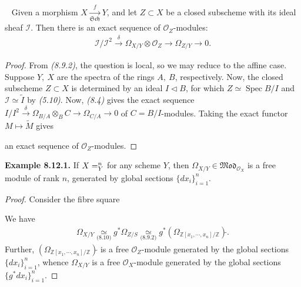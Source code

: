 \documentclass[11pt,a4paper,footinclude=true,headinclude=true]{scrbook} %
\DeclareMathOperator{\Spec}{Spec}
\let\AA\relax
\DeclareMathOperator{\AA}{\mathbb{A}}
\newcommand{\II}{\mathscr{I}}
\newcommand{\OO}{\mathcal{O}}
\newcommand{\Sch}{\mathfrak{Sch}}
\newcommand{\<}{\langle}
\newcommand{\>}{\rangle}
\newcommand{\MOD}{\mathfrak{Mod}}
\newcommand\FibSq[2][\square]{%
  \arrow[mysymbol]{#2}[description]{#1}}
\newenvironment{proposition}[2][]
{\renewcommand\theinnercustomprop{#2}\innercustomprop[#1] 
\begin{mdframed}[backgroundcolor=gray!20]\ }
{\end{mdframed}\endinnercustomprop}
\newenvironment{example}[2][Example]
    { \begin{mdframed}[backgroundcolor=gray!20] \textbf{#1 #2.} }
    {  \end{mdframed}}
\begin{document}
\begin{proposition}{8.12}
    Given a morphism $X\xrightarrow[\Sch]{f}Y$, and let $Z\subset X$ be a closed subscheme with its ideal sheaf $\II$. Then there is an exact sequence of $\OO_Z$-modules:
    \begin{align*}
        \II/\II^2\xrightarrow{~~\delta~~}\Omega_{X/Y}\otimes\OO_Z\longrightarrow\Omega_{Z/Y}\longrightarrow0.
    \end{align*}
\end{proposition}
\begin{proof}
    From \textit{(8.9.2)}, the question is local, so we may reduce to the affine case. Suppose $Y,\ X$ are the spectra of the rings $A,\ B$, respectively. Now, the closed subscheme $Z\subset X$ is determined by an ideal $I\triangleleft B$, for which $Z\simeq\Spec B/I$ and $\II\simeq\widetilde{I}$ by \textit{(5.10)}. Now, \textit{(8.4)} gives the exact sequence $I/I^2\xrightarrow{\delta}\Omega_{B/A}\otimes_BC\to\Omega_{C/A}\to0$ of $C=B/I$-modules. Taking the exact functor $M\mapsto\widetilde{M}$ gives
    \begin{center}
    \end{center}
    an exact sequence of $\OO_Z$-modules.
\end{proof}

\begin{example}{8.12.1}
    If $X=\AA_Y^n$ for any scheme $Y$, then $\Omega_{X/Y}\in\MOD_{\OO_X}$ is a free module of rank $n$, generated by global sections $\{dx_i\}_{i=1}^n$. 
\end{example}
\begin{proof}
    Consider the fibre square
    \begin{center}
    \end{center}
    We have 
    \begin{align*}
        \Omega_{X/Y}\underset{\textit{(8.10)}}{\simeq}g^\ast\Omega_{Z/S}\underset{\textit{(8.9.2)}}{\simeq}g^\ast(\Omega_{\mathbb{Z}[x_1,\cdots,x_n]/\mathbb{Z}})\widetilde{}.
    \end{align*}
    Further, $(\Omega_{\mathbb{Z}[x_1,\cdots,x_n]/\mathbb{Z}})\widetilde{}$ is a free $\OO_Z$-module generated by the global sections $\{dx_i\}_{i=1}^n$, whence $\Omega_{X/Y}$ is a free $\OO_X$-module generated by the global sections $\{g^\ast dx_i\}_{i=1}^n$.
\end{proof}
\end{document}
